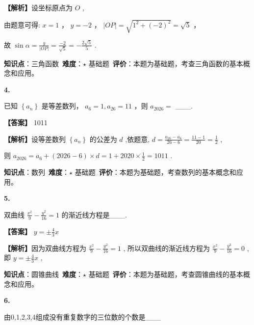 \documentclass[10pt]{article}
\newenvironment{questionblock}[1]{%
  \needspace{3\baselineskip}%
  \noindent\textbf{#1.}%
}{%
  \par\vspace{1em}%
}
\begin{document}
\textbf{【解析】}设坐标原点为 \(O\) ,

由题意可得: \(x = 1\) ， \(y =  - 2\) ， \(\left| {OP}\right|  = \sqrt{{1}^{2} + {\left( -2\right) }^{2}} = \sqrt{5}\) ，

故 \(\sin \alpha  = \frac{y}{\left| OP\right| } = \frac{-2}{\sqrt{5}} =  - \frac{2\sqrt{5}}{5}\) .

\begin{analysisbox}[考点分析]
\textbf{知识点}：三角函数\
\textbf{难度}：$\star$ 基础题\
\textbf{评价}：本题为基础题，考查三角函数的基本概念和应用。
\end{analysisbox}

\begin{questionblock}{4}
已知 \(\left\{  {a}_{n}\right\}\) 是等差数列， \({a}_{6} = 1,{a}_{26} = {11}\) ，则 \({a}_{2026} =\) ___.
\end{questionblock}

\textbf{【答案】} 1011

\textbf{【解析】}设等差数列 \(\left\{  {a}_{n}\right\}\) 的公差为 \(d\) ,依题意, \(d = \frac{{a}_{26} - {a}_{6}}{{26} - 6} = \frac{{11} - 1}{20} = \frac{1}{2}\) ,

则 \({a}_{2026} = {a}_{6} + \left( {{2026} - 6}\right)  \times  d = 1 + {2020} \times  \frac{1}{2} = {1011}\) .

\begin{analysisbox}[考点分析]
\textbf{知识点}：数列\
\textbf{难度}：$\star$ 基础题\
\textbf{评价}：本题为基础题，考查数列的基本概念和应用。
\end{analysisbox}

\begin{questionblock}{5}
双曲线 \(\frac{{x}^{2}}{9} - \frac{{y}^{2}}{16} = 1\) 的渐近线方程是___.
\end{questionblock}

\textbf{【答案】} \(y =  \pm  \frac{4}{3}x\)

\textbf{【解析】}因为双曲线方程为 \(\frac{{x}^{2}}{9} - \frac{{y}^{2}}{16} = 1\) , 所以双曲线的渐近线方程为 \(\frac{{x}^{2}}{9} - \frac{{y}^{2}}{16} = 0\) ,即 \(y =  \pm  \frac{4}{3}x\) ,

\begin{analysisbox}[考点分析]
\textbf{知识点}：圆锥曲线\
\textbf{难度}：$\star$ 基础题\
\textbf{评价}：本题为基础题，考查圆锥曲线的基本概念和应用。
\end{analysisbox}

\begin{questionblock}{6}
由0,1,2,3,4组成没有重复数字的三位数的个数是___
\end{questionblock}
\end{document}
